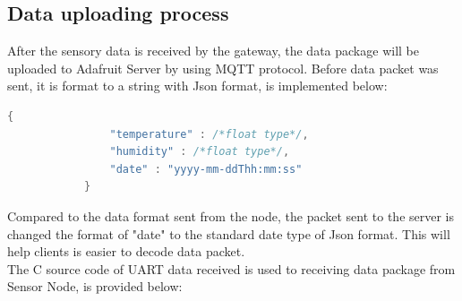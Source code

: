 \documentclass[13pt,a4paper]{article}
\begin{document}
		 \subsection{Data uploading process}
		 After the sensory data is received by the gateway, the data package will be uploaded to Adafruit Server by using MQTT protocol. Before data packet was sent, it is format to a string with Json format, is implemented below:
		 \begin{lstlisting}[language=C, caption= Json Data Format, label=test_float]
		 	{
		 		"temperature" : /*float type*/,
		 		"humidity" : /*float type*/,
		 		"date" : "yyyy-mm-ddThh:mm:ss"
		 	}
		 \end{lstlisting}
		 Compared to the data format sent from the node, the packet sent to the server is changed the format of "date" to the standard date type of Json format. This will help clients is easier to decode data packet. \\
		 The C source code of UART data received is used to receiving data package from Sensor Node, is provided below:
\end{document}
